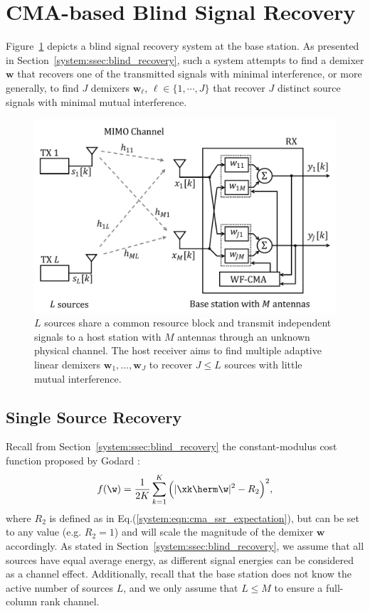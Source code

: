 \section{CMA-based Blind Signal Recovery}\label{wfcma:SystemModel}
Figure~\ref{wfcma:fig:system_model} depicts a blind signal recovery system at the base station. As presented in Section~\ref{system:ssec:blind_recovery}, such a system attempts to find a demixer $\bm{w}$ that recovers one of the transmitted signals with minimal interference, or more generally, to find $J$ demixers $\bm{w}_\ell$, $\ell\in\{1,\cdots,J\}$ that recover $J$ distinct source signals with minimal mutual interference.
{\begin{figure}[tbp]
		\centering
		\includegraphics[width=0.6\linewidth]{./figs/wfcma_figs/WF-CMA_system_model.pdf}
		\caption{$L$ sources share a common resource block and transmit independent signals to a host station with $M$ antennas through an unknown physical channel. The host receiver aims to find multiple adaptive linear demixers $\bm{w}_1,\ldots,\bm{w}_J$ to recover $J\leq L$ sources with little mutual interference.}\label{wfcma:fig:system_model}
\end{figure}}

\subsection{Single Source Recovery}
Recall from Section~\ref{system:ssec:blind_recovery} the constant-modulus cost function proposed by Godard \cite{Godard1980cma}:
\begin{align}
	f(\w)=\displaystyle{\frac{1}{2K}\sum_{k=1}^K\Big(|\xk\herm\w|^2-R_2\Big)^2},\label{wfcma:eqn:cma_orig}
\end{align}
where $R_2$ is defined as in Eq.(\ref{system:eqn:cma_ssr_expectation}), but can be set to any value (e.g. $R_2=1$) and will scale the magnitude of the demixer $\bm{w}$ accordingly. As stated in Section~\ref{system:ssec:blind_recovery}, we assume that all sources have equal average energy, as different signal energies can be considered as a channel effect. Additionally, recall that the base station does not know the active number of sources $L$, and we only assume that $L\leq M$ to ensure a full-column rank channel.

